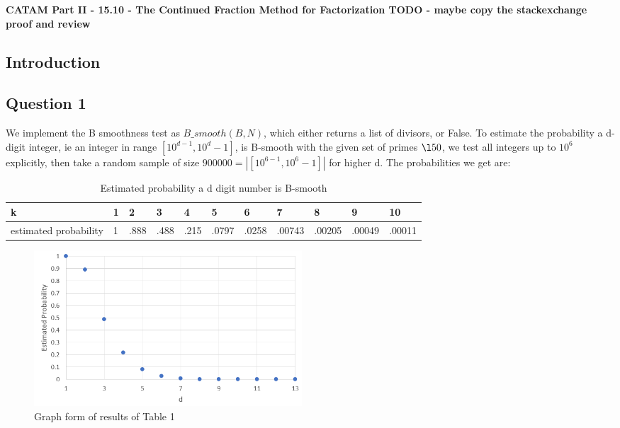 \documentclass[10pt,a4paper]{report}
\begin{document}
\textbf{CATAM Part II - 15.10 - The Continued Fraction Method for
Factorization TODO - maybe copy the stackexchange proof and review}
\thispagestyle{empty}

\newpage

\subsection*{Introduction}

\subsection*{Question 1}
We implement the B smoothness test as $B\_smooth(B,N)$, which either returns a list of divisors, or False. To estimate the probability a d-digit integer, ie an integer in range $[10^{d-1},10^d-1]$, is B-smooth with the given set of primes $\l 50$, we test all integers up to $10^6$ explicitly, then take a random sample of size $900000 = | [10^{6-1},10^6-1] |$ for higher d. The probabilities we get are:

\begin{table}[h]
\centering
\begin{tabular}{|l|l|l|l|l|l|l|l|l|l|l|}
\hline
k                     & 1 & 2    & 3    & 4    & 5     & 6     & 7      & 8      & 9      & 10     \\ \hline
estimated probability & 1 & .888 & .488 & .215 & .0797 & .0258 & .00743 & .00205 & .00049 & .00011 \\ \hline
\end{tabular}
\caption{Estimated probability a d digit number is B-smooth}
\label{tab:my-table}
\end{table}

\begin{figure}[h]
\centering
\includegraphics[width=10cm]{q1graph.png}
\caption{Graph form of results of Table 1}
\end{figure}
\end{document}
